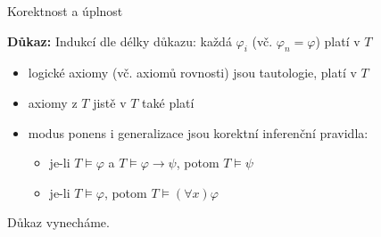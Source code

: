 \documentclass{beamer}
\begin{document}
\begin{frame}{Korektnost a úplnost}

    \pause

    \medskip

    \pause
    \textbf{Důkaz:} Indukcí dle délky důkazu: každá $\varphi_i$ (vč. $\varphi_n=\varphi$) platí v $T$\pause
    \begin{itemize}
        \item logické axiomy (vč. axiomů rovnosti) jsou tautologie, platí v $T$\pause
        \item axiomy z $T$ jistě v $T$ také platí\pause
         \item modus ponens i generalizace jsou \alert{korektní} inferenční pravidla:\pause
        \begin{itemize}
            \item je-li $T\models\varphi$ a $T\models\varphi\to\psi$, potom $T\models\psi$\pause
            \item je-li $T\models\varphi$, potom $T\models(\forall x)\varphi$
            \hfill\qedsymbol
        \end{itemize}
    \end{itemize}

    \bigskip
    
    \pause

    Důkaz vynecháme.
    
\end{frame}
\end{document}
